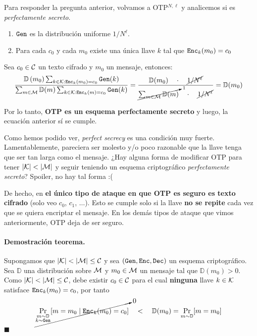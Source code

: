 Para responder la pregunta anterior, volvamos a OTP$^{N,\ell}$ y analicemos si es \textit{perfectamente secreto}.
\begin{enumerate}
    \item $\texttt{Gen}$ es la distribución uniforme $1/N^\ell$.
    \item Para cada $c_0$ y cada $m_0$ existe una única llave $k$ tal que $\texttt{Enc}_k(m_0) = c_0$
\end{enumerate}

Sea $c_0 \in \mathcal{C}$ un texto cifrado y $m_0$ un mensaje, entonces:
$$
    \frac{\mathbb{D}\left(m_0\right) \sum_{k \in \mathcal{K}: \texttt{Enc}_k\left(m_0\right)=c_0} \texttt{Gen}(k)}{\sum_{m \in \mathcal{M}} \mathbb{D}(m) \sum_{k \in \mathcal{K}: \texttt{Enc}_k(m)=c_0} \texttt{Gen}(k)} = \frac{\mathbb{D}(m_0) \quad \cdot \quad \cancel{1/N^\ell}}{\cancelto{1}{\sum_{m \in \mathcal{M}}\mathbb{D}(m)} \quad \cdot \quad \cancel{1/N^\ell}} = \mathbb{D}(m_0)
$$

Por lo tanto, \textbf{OTP es un esquema perfectamente secreto} y luego, la ecuación anterior sí se cumple. \medbreak

Como hemos podido ver, \textit{perfect secrecy} es una condición muy fuerte. Lamentablemente, pareciera ser molesto y/o poco razonable que la llave tenga que ser tan larga como el mensaje. ¿Hay alguna forma de modificar OTP para tener $|\mathcal{K}| < |\mathcal{M}|$ y seguir teniendo un esquema criptográfico \textit{perfectamente secreto}? Spoiler, no hay tal forma :(


De hecho, en \textbf{el único tipo de ataque en que OTP es seguro es texto cifrado} (solo veo $c_0$, $c_1$, $\ldots$). Esto se cumple solo si la llave \textbf{no se repite} cada vez que se quiera encriptar el mensaje. En los demás tipos de ataque que vimos anteriormente, OTP deja de ser seguro.

\paragraph*{Demostración teorema.} Supongamos que $|\mathcal{K}| < |\mathcal{M}| \leq \mathcal{C}$ y sea $(\texttt{Gen}, \texttt{Enc}, \texttt{Dec})$ un esquema criptográfico. Sea $\mathbb{D}$ una distribución sobre $\mathcal{M}$ y $m_0 \in \mathcal{M}$ un mensaje tal que $\mathbb{D}(m_0) > 0$. Como $|\mathcal{K}| < |\mathcal{M}| \leq \mathcal{C}$, debe existir $c_0 \in \mathcal{C}$ para el cual \textbf{ninguna} llave $k \in \mathcal{K}$ satisface $\texttt{Enc}_k(m_0) = c_0$, por tanto
$$
    \cancelto{0}{\Pr_{\substack{m \sim \mathbb{D} \\ k \sim \texttt{Gen}}} [m = m_0 \mid \texttt{Enc}_k(m_0) = c_0]} \quad < \quad \mathbb{D}(m_0) = \Pr_{m \sim \mathbb{D}} [m = m_0]
$$
\hfill $\blacksquare$

